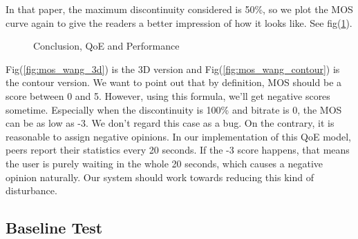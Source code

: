 \documentclass[11pt,a4paper]{article}
\begin{document}
In that paper, the maximum discontinuity considered is 50\%, so we 
plot the MOS curve again to give the readers a better impression of how
it looks like. See fig(\ref{fig:mos_wang}). 

\begin{figure}[htb]
\centering
	\caption{Conclusion, QoE and Performance}
	\label{fig:mos_wang}
\end{figure}

Fig(\ref{fig:mos_wang_3d}) is the 3D version and Fig(\ref{fig:mos_wang_contour})
is the contour version. We want to point out that by definition, MOS 
should be a score between 0 and 5. However, using this formula, we'll get
negative scores sometime. Especially when the discontinuity is 100\% and
bitrate is 0, the MOS can be as low as -3. We don't regard this case as 
a bug. On the contrary, it is reasonable to assign negative opinions. 
In our implementation of this QoE model, peers report their statistics every 
20 seconds. If the -3 score happens, that means the user is purely waiting 
in the whole 20 seconds, which causes a negative opinion naturally. 
Our system should work towards reducing this kind of disturbance. 

\subsection{Baseline Test}
\label{sec:simu_base}
\end{document}
